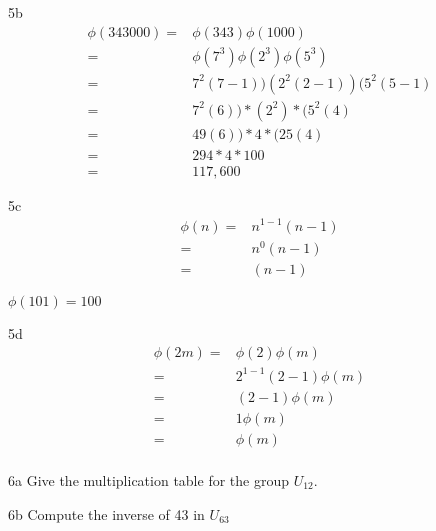 \begin{question}{5b}
\begin{align*}
\phi(343000) =& \phi(343)\phi(1000)\\
=& \phi(7^3)\phi(2^3)\phi(5^3)\\
=& 7^2(7-1)) (2^2(2-1)) (5^2(5-1)\\
=& 7^2(6))*(2^2)*(5^2(4)\\
=& 49(6))*4*(25(4)\\
=& 294*4*100\\
=& 117,600
\end{align*}
\end{question}

\begin{question}{5c}
\begin{align*}
\phi(n) =& n^{1-1}(n-1)\\
=& n^{0}(n-1)\\
=& (n-1)
\end{align*}

$\phi(101)=100$
\end{question}

\begin{question}{5d}
\begin{align*}
\phi(2m) =& \phi(2) \phi(m)\\
=& 2^{1-1}(2-1) \phi(m)\\
=& (2-1) \phi(m)\\
=& 1\phi(m)\\
=& \phi(m)\\
\end{align*}
\end{question}






\begin{question}{6a}
Give the multiplication table for the group $U_{12}$.
\end{question}

\begin{question}{6b}
Compute the inverse of 43 in $U_{63}$
\end{question}




